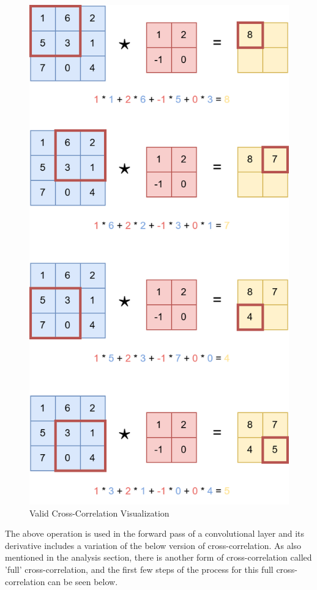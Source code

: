\documentclass{article}
\begin{document}
    \begin{figure}[h]
        \centering
        \includegraphics[scale=0.275]{Cross-Correlation-Algorithm.drawio.png}
        \caption{Valid Cross-Correlation Visualization}
    \end{figure}
    
    The above operation is used in the forward pass of a convolutional layer and its derivative includes a variation of the below version of cross-correlation. 
    As also mentioned in the analysis section, there is another form of cross-correlation called 'full' cross-correlation, and the first few steps of the 
    process for this full cross-correlation can be seen below.
\end{document}
